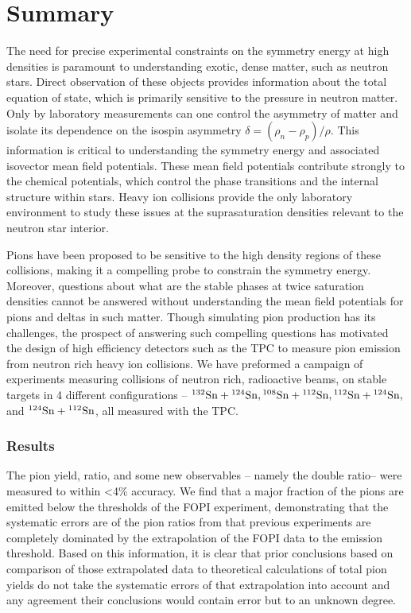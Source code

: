 \chapter{Summary}
\label{chap:summary}

The need for precise experimental constraints on the symmetry energy at high densities is paramount to understanding exotic, dense matter, such as neutron stars. Direct observation of these objects provides information about the total equation of state, which is primarily sensitive to the pressure in neutron matter. Only by laboratory measurements can one control the asymmetry of matter and isolate its dependence on the isospin asymmetry $\delta =(\rho_n - \rho_p)/\rho$. This information is critical to understanding the symmetry energy and associated isovector mean field potentials. These mean field potentials contribute strongly to the chemical potentials, which control the phase transitions and the internal structure within stars. Heavy ion collisions provide the only laboratory environment to study these issues at the suprasaturation densities relevant to the neutron star interior.  

Pions have been proposed to be sensitive to the high density regions of these collisions, making it a compelling probe to constrain the symmetry energy. Moreover, questions about what are the stable phases at twice saturation densities cannot be answered without understanding the mean field potentials for pions and deltas in such matter. Though simulating pion production has its challenges, the prospect of answering such compelling questions has motivated the design of high efficiency detectors such as the \spirit TPC to measure pion emission from neutron rich heavy ion collisions. We have preformed a campaign of experiments measuring collisions of neutron rich, radioactive beams, on stable targets in 4 different configurations -- ${}^{132}\mathrm{Sn} + {}^{124}\mathrm{Sn}, {}^{108}\mathrm{Sn} + {}^{112}\mathrm{Sn}, {}^{112}\mathrm{Sn} + {}^{124}\mathrm{Sn},$ and ${}^{124}\mathrm{Sn} + {}^{112}\mathrm{Sn}$, all measured with the \spirit TPC. 

\subsection{Results}
The pion yield, ratio, and some new observables -- namely the double ratio-- were measured to within <4\% accuracy. We find that a major fraction of the pions are emitted below the thresholds of the FOPI experiment, demonstrating that the systematic errors are of the pion ratios from that previous experiments are completely dominated by the extrapolation of the FOPI data to the emission threshold. Based on this information, it is clear that prior conclusions based on comparison of those extrapolated data to theoretical calculations of total pion yields do not take the systematic errors of that extrapolation into account and any agreement their conclusions would contain error but to an unknown degree. 

